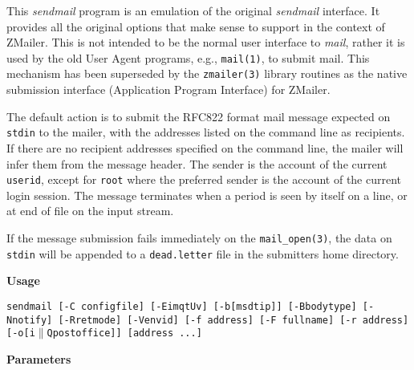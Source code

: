 
This {\em sendmail\/} program is an emulation of the original
{\em sendmail\/} interface. It provides all the original options
that make sense to support in the context of ZMailer.
This is not intended to be the normal user interface to
{\em mail\/}, rather it is used by the old User Agent programs, e.g.,
{\tt mail(1)}, to submit mail. This mechanism has been superseded
by the {\tt zmailer(3)} library routines as the native
submission interface (Application Program Interface) for ZMailer.

The default action is to submit the RFC822 format mail
message expected on {\tt stdin} to the mailer, with the
addresses listed on the command line as recipients. If
there are no recipient addresses specified on the command
line, the mailer will infer them from the message header.
The sender is the account of the current {\tt userid}, 
except for {\tt root} where the preferred sender is the 
account of the current login session. The message terminates 
when a period is seen by itself on a line, or at end of file on
the input stream.

If the message submission fails immediately on the
{\tt mail\_open(3)}, the data on {\tt stdin} will be 
appended to a {\tt dead.letter} file in the submitters home directory.

{\bf Usage}

{\tt sendmail [-C configfile] [-EimqtUv] [-b[msdtip]]
[-Bbodytype] [-Nnotify] [-Rretmode]
[-Venvid] [-f address] [-F fullname]
[-r address] [-o[i$\|$Qpostoffice]] [address ...]}

{\bf Parameters}

